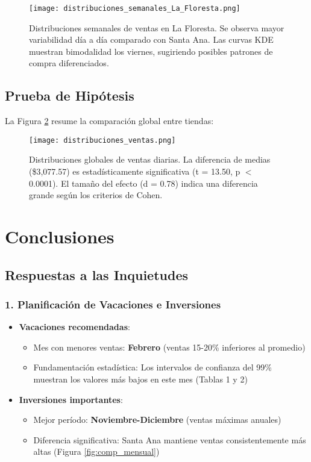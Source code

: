 \documentclass[12pt]{article}
\begin{document}
\begin{figure}[H]
\centering
\texttt{[image: distribuciones\_semanales\_La\_Floresta.png]}
\caption{Distribuciones semanales de ventas en La Floresta. Se observa mayor variabilidad día a día comparado con Santa Ana. Las curvas KDE muestran bimodalidad los viernes, sugiriendo posibles patrones de compra diferenciados.}
\label{fig:dist_semanal_lf}
\end{figure}

\subsection{Prueba de Hipótesis}

La Figura \ref{fig:dist_ventas} resume la comparación global entre tiendas:

\begin{figure}[H]
\centering
\texttt{[image: distribuciones\_ventas.png]}
\caption{Distribuciones globales de ventas diarias. La diferencia de medias (\$3,077.57) es estadísticamente significativa (t = 13.50, p $<$ 0.0001). El tamaño del efecto (d = 0.78) indica una diferencia grande según los criterios de Cohen.}
\label{fig:dist_ventas}
\end{figure}

\section{Conclusiones}

\subsection{Respuestas a las Inquietudes}

\subsubsection{1. Planificación de Vacaciones e Inversiones}

\begin{itemize}
\item \textbf{Vacaciones recomendadas}: 
\begin{itemize}
\item Mes con menores ventas: \textbf{Febrero} (ventas 15-20\% inferiores al promedio)
\item Fundamentación estadística: Los intervalos de confianza del 99\% muestran los valores más bajos en este mes (Tablas 1 y 2)
\end{itemize}

\item \textbf{Inversiones importantes}:
\begin{itemize}
\item Mejor período: \textbf{Noviembre-Diciembre} (ventas máximas anuales)
\item Diferencia significativa: Santa Ana mantiene ventas consistentemente más altas (Figura \ref{fig:comp_mensual})
\end{itemize}
\end{itemize}
\end{document}

